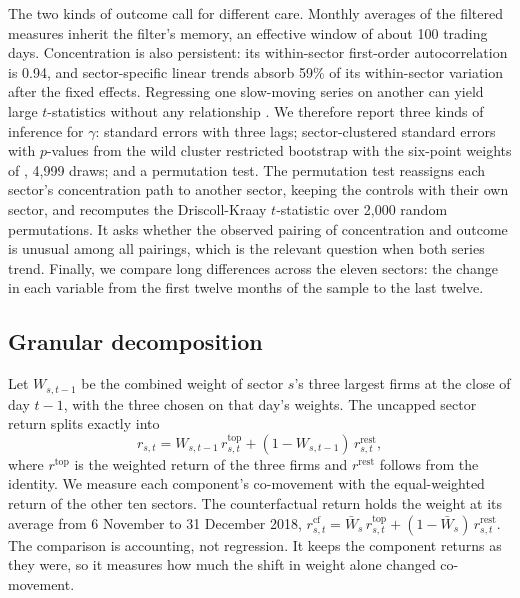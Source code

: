 \documentclass[11pt]{article}
\begin{document}
The two kinds of outcome call for different care. Monthly averages of the filtered measures inherit the filter's memory, an effective window of about 100 trading days. Concentration is also persistent: its within-sector first-order autocorrelation is 0.94, and sector-specific linear trends absorb 59\% of its within-sector variation after the fixed effects. Regressing one slow-moving series on another can yield large $t$-statistics without any relationship \citep{ferson2003}. We therefore report three kinds of inference for $\gamma$: \citet{driscoll1998} standard errors with three lags; sector-clustered standard errors with $p$-values from the wild cluster restricted bootstrap with the six-point weights of \citet{webb2023}, 4,999 draws; and a permutation test. The permutation test reassigns each sector's concentration path to another sector, keeping the controls with their own sector, and recomputes the Driscoll-Kraay $t$-statistic over 2,000 random permutations. It asks whether the observed pairing of concentration and outcome is unusual among all pairings, which is the relevant question when both series trend. Finally, we compare long differences across the eleven sectors: the change in each variable from the first twelve months of the sample to the last twelve.

\subsection{Granular decomposition}

Let $W_{s,t-1}$ be the combined weight of sector $s$'s three largest firms at the close of day $t-1$, with the three chosen on that day's weights. The uncapped sector return splits exactly into
\begin{equation}
r_{s,t} = W_{s,t-1}\, r^{\text{top}}_{s,t} + (1-W_{s,t-1})\, r^{\text{rest}}_{s,t},
\end{equation}
where $r^{\text{top}}$ is the weighted return of the three firms and $r^{\text{rest}}$ follows from the identity. We measure each component's co-movement with the equal-weighted return of the other ten sectors. The counterfactual return holds the weight at its average from 6 November to 31 December 2018, $r^{\text{cf}}_{s,t} = \bar W_s\, r^{\text{top}}_{s,t} + (1-\bar W_s)\, r^{\text{rest}}_{s,t}$. The comparison is accounting, not regression. It keeps the component returns as they were, so it measures how much the shift in weight alone changed co-movement.

\end{document}
